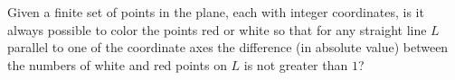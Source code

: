 Given a finite set of points in 
the plane, each with integer coordinates, is it always possible to color
 the points red or white so that for any straight line $L$ parallel to one of the coordinate axes the difference (in absolute value) between the numbers of white and red points on $L$ is not greater than $1$?

